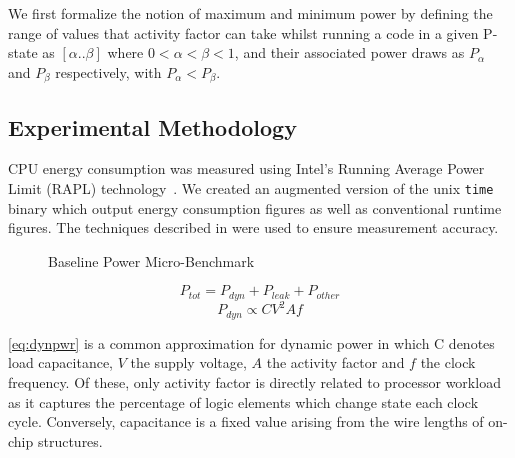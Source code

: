 We first formalize the notion of maximum and minimum power by defining the range of values that activity factor can take whilst running a code in a given P-state as $[\alpha  .. \beta]$ where $0 < \alpha < \beta < 1$, and their associated power draws as $P_{\alpha}$ and $P_{\beta}$ respectively, with $P_{\alpha} < P_{\beta}$. 

\subsection{Experimental Methodology}

CPU energy consumption was measured using Intel's Running Average Power Limit (RAPL) technology~\cite{david:2010aa}. 
We created an augmented version of the unix \texttt{time} binary which output energy consumption figures as well as conventional runtime figures.
The techniques described in \cite{hackenberg:2013aa} were used to ensure measurement accuracy. 


\begin{figure}[ht]                                                               
\centering                                                                      
\lstset{basicstyle=\ttfamily\footnotesize\bfseries, frame=tb} %
              
\caption{Baseline Power Micro-Benchmark}                            
\label{fig:microbench}                                                           
\end{figure}  








\begin{equation}
\label{eq:totpwr}
P_{tot} = P_{dyn} + P_{leak} + P_{other}
\end{equation}
\begin{equation} 
\label{eq:dynpwr}
P_{dyn} \propto CV^{2}Af
\end{equation}

\autoref{eq:dynpwr} is a common approximation for dynamic power in which C denotes load capacitance, $V$ the supply voltage, $A$ the activity factor and $f$ the clock frequency.
Of these, only activity factor is directly related to processor workload as it captures the percentage of logic elements which change state each clock cycle.
Conversely, capacitance is a fixed value arising from the wire lengths of on-chip structures.


